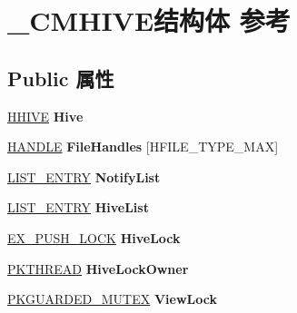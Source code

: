 \hypertarget{struct___c_m_h_i_v_e}{}\section{\+\_\+\+C\+M\+H\+I\+V\+E结构体 参考}
\label{struct___c_m_h_i_v_e}
\subsection*{Public 属性}
\begin{DoxyCompactItemize}
\item 
\mbox{\label{struct___c_m_h_i_v_e_a0f879a53446f3ce953a1193e62e66d70}} 
\hyperlink{struct___h_h_i_v_e}{H\+H\+I\+VE} {\bfseries Hive}
\item 
\mbox{\label{struct___c_m_h_i_v_e_aa5d697b2d42753c8c8b9e142e812bac0}} 
\hyperlink{interfacevoid}{H\+A\+N\+D\+LE} {\bfseries File\+Handles} \mbox{[}H\+F\+I\+L\+E\+\_\+\+T\+Y\+P\+E\+\_\+\+M\+AX\mbox{]}
\item 
\mbox{\label{struct___c_m_h_i_v_e_a1e017ee9496f6b7b1bc9b44b3043d2bc}} 
\hyperlink{struct___l_i_s_t___e_n_t_r_y}{L\+I\+S\+T\+\_\+\+E\+N\+T\+RY} {\bfseries Notify\+List}
\item 
\mbox{\label{struct___c_m_h_i_v_e_a31c2fc35260bbac0165286f7fcb18a8f}} 
\hyperlink{struct___l_i_s_t___e_n_t_r_y}{L\+I\+S\+T\+\_\+\+E\+N\+T\+RY} {\bfseries Hive\+List}
\item 
\mbox{\label{struct___c_m_h_i_v_e_aed010c228400b75b7c74434ae5d2f780}} 
\hyperlink{struct___e_x___p_u_s_h___l_o_c_k}{E\+X\+\_\+\+P\+U\+S\+H\+\_\+\+L\+O\+CK} {\bfseries Hive\+Lock}
\item 
\mbox{\label{struct___c_m_h_i_v_e_a45f03ccd4ff4b05f363814e0a48c3d4d}} 
\hyperlink{struct___k_t_h_r_e_a_d}{P\+K\+T\+H\+R\+E\+AD} {\bfseries Hive\+Lock\+Owner}
\item 
\mbox{\label{struct___c_m_h_i_v_e_a2bdc21d1118b6420fe1ef78f8005a45c}} 
\hyperlink{struct___k_g_u_a_r_d_e_d___m_u_t_e_x}{P\+K\+G\+U\+A\+R\+D\+E\+D\+\_\+\+M\+U\+T\+EX} {\bfseries View\+Lock}
\item 

\end{DoxyCompactItemize}
